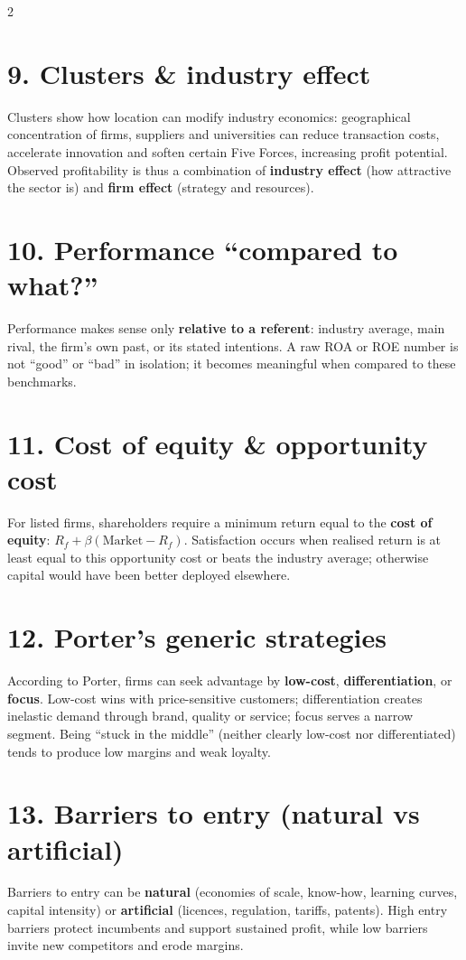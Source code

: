 \documentclass[8pt,landscape,a4paper]{article}
\begin{document}
\begin{multicols}{2}
\section*{\color{eublue}9. Clusters \& industry effect}
Clusters show how location can modify industry economics: geographical concentration of firms, suppliers and universities can reduce transaction costs, accelerate innovation and soften certain Five Forces, increasing profit potential. Observed profitability is thus a combination of \textbf{industry effect} (how attractive the sector is) and \textbf{firm effect} (strategy and resources).

\section*{\color{eublue}10. Performance ``compared to what?''}
Performance makes sense only \textbf{relative to a referent}: industry average, main rival, the firm's own past, or its stated intentions. A raw ROA or ROE number is not ``good'' or ``bad'' in isolation; it becomes meaningful when compared to these benchmarks.

\section*{\color{eublue}11. Cost of equity \& opportunity cost}
For listed firms, shareholders require a minimum return equal to the \textbf{cost of equity}: $R_f + \beta(\text{Market} - R_f)$. Satisfaction occurs when realised return is at least equal to this opportunity cost or beats the industry average; otherwise capital would have been better deployed elsewhere.

\section*{\color{eublue}12. Porter's generic strategies}
According to Porter, firms can seek advantage by \textbf{low-cost}, \textbf{differentiation}, or \textbf{focus}. Low-cost wins with price-sensitive customers; differentiation creates inelastic demand through brand, quality or service; focus serves a narrow segment. Being ``stuck in the middle'' (neither clearly low-cost nor differentiated) tends to produce low margins and weak loyalty.

\section*{\color{eublue}13. Barriers to entry (natural vs artificial)}
Barriers to entry can be \textbf{natural} (economies of scale, know-how, learning curves, capital intensity) or \textbf{artificial} (licences, regulation, tariffs, patents). High entry barriers protect incumbents and support sustained profit, while low barriers invite new competitors and erode margins.


\end{multicols}
\end{document}
